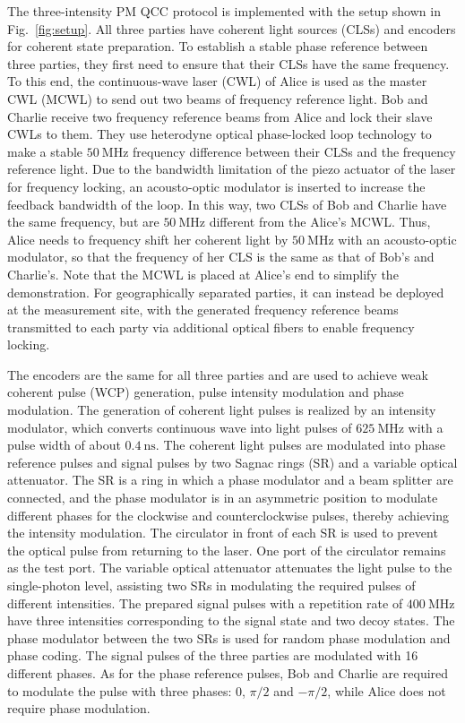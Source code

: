 \documentclass[aps,twocolumn,superscriptaddress,showpacs,nofootinbib]{revtex4-2}
\begin{document}
The three-intensity PM QCC protocol is implemented with the setup shown in Fig.~\ref{fig:setup}.  All three parties have coherent light sources (CLSs) and encoders for coherent state preparation. To establish a stable phase reference between three parties, they first need to ensure that their CLSs have the same frequency. To this end, the continuous-wave laser (CWL) of Alice is used as the master CWL (MCWL) to send out two beams of frequency reference light. Bob and Charlie receive two frequency reference beams from Alice and lock their slave CWLs to them. They use heterodyne optical phase-locked loop technology \cite{NPMinder2019} to make a stable  $\SI{50}{\MHz}$ frequency difference between their CLSs and the frequency reference light. Due to the bandwidth limitation of the piezo actuator of the laser for frequency locking, an acousto-optic modulator is inserted to increase the feedback bandwidth of the loop. In this way, two CLSs of Bob and Charlie have the same frequency, but are  $\SI{50}{\MHz}$ different from the Alice's MCWL. Thus, Alice needs to frequency shift her coherent light by  $\SI{50}{\MHz}$ with an acousto-optic modulator, so that the frequency of her CLS is the same as that of Bob's and Charlie's. Note that the MCWL is placed at Alice's end to simplify the demonstration. For geographically separated parties, it can instead be deployed at the measurement site, with the generated frequency reference beams transmitted to each party via additional optical fibers to enable frequency locking.

The encoders are the same for all three parties and are used to achieve weak coherent pulse (WCP) generation, pulse intensity modulation and phase modulation. The generation of coherent light pulses is realized by an intensity modulator, which converts continuous wave into light pulses of  $\SI{625}{\MHz}$ with a pulse width of about  $\SI{0.4}{\ns}$. The coherent light pulses are modulated into phase reference pulses and signal pulses by two Sagnac rings (SR) and a variable optical attenuator. The SR is a ring in which a phase modulator and a beam splitter are connected, and the phase modulator is in an asymmetric position to modulate different phases for the clockwise and counterclockwise pulses, thereby achieving the intensity modulation. The circulator in front of each SR is used to prevent the optical pulse from returning to the laser. One port of the circulator remains as the test port. The variable optical attenuator attenuates the light pulse to the single-photon level, assisting two SRs in modulating the required pulses of different intensities. The prepared signal pulses with a repetition rate of  $\SI{400}{\MHz}$ have three intensities corresponding to the signal state and two decoy states. The phase modulator between the two SRs is used for random phase modulation and phase coding. The signal pulses of the three parties are modulated with 16 different phases. As for the phase reference pulses, Bob and Charlie are required to modulate the pulse with three phases: 0, $\pi/2$ and $-\pi/2$, while Alice does not require phase modulation.
\end{document}
